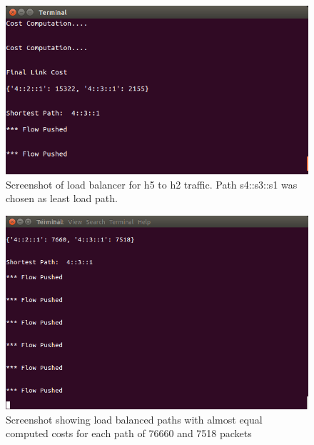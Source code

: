 \begin{figure}[h!]
 \centering
 \includegraphics[width=\linewidth]{images/loadbalancing/h2toh5.png}
 \caption{Screenshot of load balancer for h5 to h2 traffic. Path s4::s3::s1 was chosen as least load path.}
 \label{fig:h2toh5}
\end{figure}

\begin{figure}[h!]
 \centering
 \includegraphics[width=\linewidth]{images/loadbalancing/balancedcosts.png}
 \caption{Screenshot showing load balanced paths with almost equal computed costs for each path of 76660 and 7518 packets}
 \label{fig:balancedcosts}
\end{figure}

